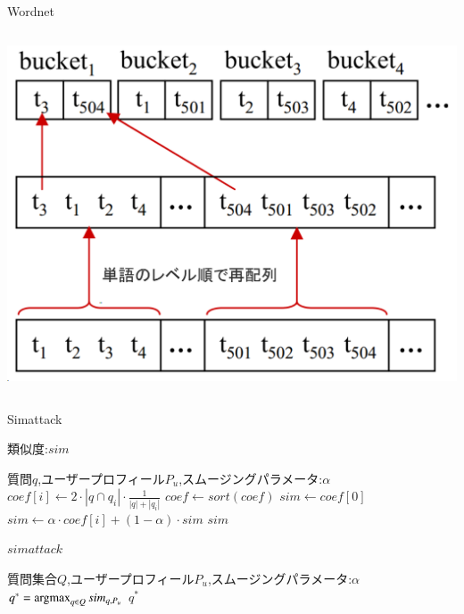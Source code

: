 \documentclass[14pt,xcolor=dvipsnames,table,dvipdfmx]{beamer}
\newcommand{\argmax}{\operatornamewithlimits{argmax}}
\begin{document}
\begin{frame}{Wordnet}
	\begin{columns}[t]
		\begin{column}{0.8\textwidth} %
			\includegraphics[width=\columnwidth]{rk13.png}
		\end{column}
	\end{columns}
\end{frame}

\begin{frame}{Simattack}
\fontsize{12pt}{7.2}\selectfont
	\begin{block}{類似度:$sim$}
	\begin{algorithmic}[1]
		\REQUIRE 質問$q$,ユーザープロフィール$P_u$,スムージングパラメータ:$\alpha$
		\STATE $coef[i] \leftarrow 2 \cdot |q \cap q_i| \cdot \frac{1}{|q|+|q_i|}$
		\ENDFOR
		\STATE $coef \gets sort(coef)$
		\STATE $sim \gets coef[0]$
		\STATE $sim \gets \alpha \cdot coef[i] + (1 - \alpha) \cdot sim$
		\ENDFOR
		\ENSURE $sim$
	\end{algorithmic}
	\end{block}
	\begin{block}{$simattack$}
	\begin{algorithmic}[1]
		\REQUIRE 質問集合$Q$,ユーザープロフィール$P_u$,スムージングパラメータ:$\alpha$
		\STATE $q^* = \argmax_{q \in Q}sim_{q,P_u}$
		\ENSURE $q^*$
	\end{algorithmic}
	\end{block}
\end{frame}
\end{document}
